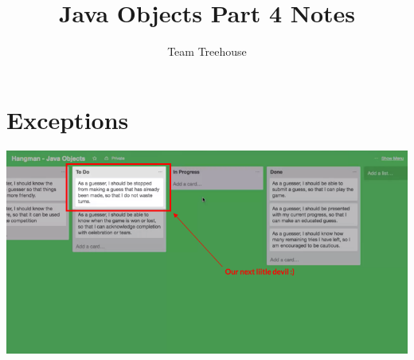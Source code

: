 \documentclass[12pt]{article}
\begin{document}
\title{Java Objects Part 4 Notes}
\author{Team Treehouse}
\maketitle

\section{Exceptions}

\bigskip

\begin{center}
\includegraphics[width=\linewidth]{images/part_4_notes_1.png}
\end{center}
\end{document}
